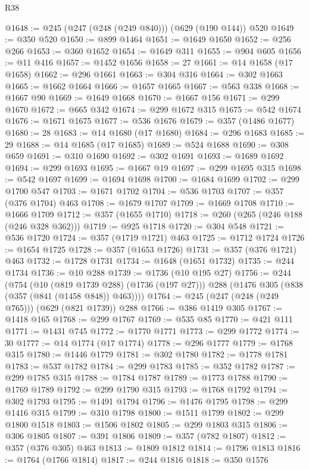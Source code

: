 \begin{lexlean}{R38}
\begin{coremodule}
@1648 := @245 (@247 (@248 (@249 @840))) (@629 (@190 @144)) @520
@1649 := @350 @520
@1650 := @899 @1464
@1651 := @1649 @1650
@1652 := @256 @266
@1653 := @360 @1652
@1654 := @1649 @311
@1655 := @904 @605
@1656 := @11 @416
@1657 := @1452 @1656
@1658 := 27
@1661 := @14 @1658 (@17 @1658)
@1662 := @296 @1661
@1663 := @304 @316
@1664 := @302 @1663
@1665 := @1662 @1664
@1666 := @1657 @1665
@1667 := @563 @338
@1668 := @1667 @90
@1669 := @1649 @1668
@1670 := @1667 @156
@1671 := @299 @1670
@1672 := @665 @342
@1674 := @299 @1672 @315
@1675 := @542 @1674
@1676 := @1671 @1675
@1677 := @536 @1676
@1679 := @357 (@1486 @1677)
@1680 := 28
@1683 := @14 @1680 (@17 @1680)
@1684 := @296 @1683
@1685 := 29
@1688 := @14 @1685 (@17 @1685)
@1689 := @524 @1688
@1690 := @308 @659
@1691 := @310 @1690
@1692 := @302 @1691
@1693 := @1689 @1692
@1694 := @299 @1693
@1695 := @1667 @19
@1697 := @299 @1695 @315
@1698 := @542 @1697
@1699 := @1694 @1698
@1700 := @1684 @1699
@1702 := @299 @1700 @547
@1703 := @1671 @1702
@1704 := @536 @1703
@1707 := @357 (@376 @1704) @463
@1708 := @1679 @1707
@1709 := @1669 @1708
@1710 := @1666 @1709
@1712 := @357 (@1655 @1710)
@1718 := @260 (@265 (@246 @188 (@246 @328 @362)))
@1719 := @925 @1718
@1720 := @304 @548
@1721 := @536 @1720
@1724 := @357 (@1719 @1721) @463
@1725 := @1712 @1724
@1726 := @1654 @1725
@1728 := @357 (@1653 @1726)
@1731 := @357 (@376 @1721) @463
@1732 := @1728 @1731
@1734 := @1648 (@1651 @1732)
@1735 := @244 @1734
@1736 := @10 @288
@1739 := @1736 (@10 @195 @27)
@1756 := @244
    (@754
      (@10 (@819 @1739 @288) (@1736 (@197 @27)))
      @288
      (@1476 @305 (@838 (@357 (@841 (@1458 @848)) @463))))
@1764 := @245 (@247 (@248 (@249 @765))) (@629 (@821 @1739)) @288
@1766 := @386 @1419 @305
@1767 := @1418 @165
@1768 := @299 @1767
@1769 := @535 @85
@1770 := @421 @111
@1771 := @1431 @745
@1772 := @1770 @1771
@1773 := @299 @1772
@1774 := 30
@1777 := @14 @1774 (@17 @1774)
@1778 := @296 @1777
@1779 := @1768 @315
@1780 := @1446 @1779
@1781 := @302 @1780
@1782 := @1778 @1781
@1783 := @537 @1782
@1784 := @299 @1783
@1785 := @352 @1782
@1787 := @299 @1785 @315
@1788 := @1784 @1787
@1789 := @1773 @1788
@1790 := @1769 @1789
@1792 := @299 @1790 @315
@1793 := @1768 @1792
@1794 := @302 @1793
@1795 := @1491 @1794
@1796 := @1476 @1795
@1798 := @299 @1416 @315
@1799 := @310 @1798
@1800 := @1511 @1799
@1802 := @299 @1800 @1518
@1803 := @1506 @1802
@1805 := @299 @1803 @315
@1806 := @306 @1805
@1807 := @391 @1806
@1809 := @357 (@782 @1807)
@1812 := @357 (@376 @305) @463
@1813 := @1809 @1812
@1814 := @1796 @1813
@1816 := @1764 (@1766 @1814)
@1817 := @244 @1816
@1818 := @350 @1576

\end{coremodule}
\end{lexlean}

